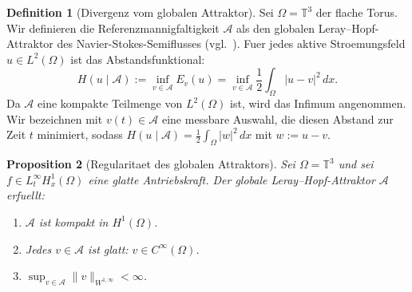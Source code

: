 \documentclass[12pt,a4paper]{article}
\theoremstyle{definition}
\newtheorem{definition}{Definition}[section]
\theoremstyle{plain}
\newtheorem{proposition}[definition]{Proposition}
\theoremstyle{remark}
\begin{document}
\begin{definition}[Divergenz vom globalen Attraktor]
Sei $\Omega = \mathbb{T}^3$ der flache Torus. Wir definieren die Referenzmannigfaltigkeit $\mathcal{A}$ als den globalen Leray--Hopf-Attraktor des Navier-Stokes-Semiflusses (vgl.\ \cite{FoiasManleyRosaTemam2001,Temam2001}). Fuer jedes aktive Stroemungsfeld $u \in L^2(\Omega)$ ist das Abstandsfunktional:
\begin{equation}
    H(u \mid \mathcal{A}) := \inf_{v \in \mathcal{A}} E_{v}(u) = \inf_{v \in \mathcal{A}} \frac{1}{2} \int_\Omega |u - v|^2 \, dx.
\end{equation}
Da $\mathcal{A}$ eine kompakte Teilmenge von $L^2(\Omega)$ ist, wird das Infimum angenommen. Wir bezeichnen mit $v(t) \in \mathcal{A}$ eine messbare Auswahl, die diesen Abstand zur Zeit $t$ minimiert, sodass $H(u \mid \mathcal{A}) = \frac{1}{2} \int_\Omega |w|^2 \, dx$ mit $w := u - v$.
\end{definition}

\begin{proposition}[Regularitaet des globalen Attraktors]
\label{prop:attractor-regularity}
Sei $\Omega = \mathbb{T}^3$ und sei $f \in L^\infty_t H^1_x(\Omega)$ eine glatte
Antriebskraft. Der globale Leray--Hopf-Attraktor $\mathcal{A}$ erfuellt:
\begin{enumerate}
    \item[\emph{(i)}]   $\mathcal{A}$ ist kompakt in $H^1(\Omega)$.
    \item[\emph{(ii)}]  Jedes $v \in \mathcal{A}$ ist glatt: $v \in C^\infty(\Omega)$.
    \item[\emph{(iii)}] $\sup_{v \in \mathcal{A}} \|v\|_{W^{1,\infty}} < \infty$.
\end{enumerate}
\end{proposition}
\end{document}
